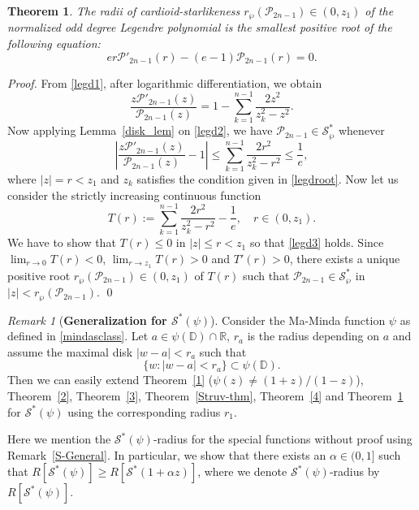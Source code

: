 \documentclass[12pt, reqno]{amsart}
\numberwithin{equation}{section}
\theoremstyle{plain}
\newtheorem{theorem}{Theorem}[section]
\theoremstyle{definition}
\theoremstyle{remark}
\newtheorem{remark}{Remark}[section]
\begin{document}
\begin{theorem}\label{5}
	The radii of cardioid-starlikeness $r_{\wp}(\mathcal{P}_{2n-1})\in (0,z_1)$ of the normalized odd degree Legendre polynomial is the smallest positive root of the following equation:
	\begin{equation*}
	er\mathcal{P}'_{2n-1}(r)-(e-1)\mathcal{P}_{2n-1}(r)=0.
	\end{equation*}	
\end{theorem}
\begin{proof}
	From \eqref{legd1}, after logarithmic differentiation, we obtain
	\begin{equation}\label{legd2}
	\frac{z\mathcal{P}'_{2n-1}(z)}{\mathcal{P}_{2n-1}(z)}=1-\sum_{k=1}^{n-1}\frac{2z^2}{z^2_k-z^2}.
	\end{equation}
	Now applying Lemma~\ref{disk_lem} on \eqref{legd2}, we have $\mathcal{P}_{2n-1}\in \mathcal{S}^{*}_{\wp}$ whenever
	\begin{equation}\label{legd3}
	\left|
	\frac{z\mathcal{P}'_{2n-1}(z)}{\mathcal{P}_{2n-1}(z)}-1\right|\leq \sum_{k=1}^{n-1}\frac{2r^2}{z^2_k-r^2}\leq\frac{1}{e},
	\end{equation}
	where $|z|=r<z_1$ and $z_k$ satisfies the condition given in \eqref{legdroot}. Now let us consider the strictly increasing continuous function
	$$T(r):=\sum_{k=1}^{n-1}\frac{2r^2}{z^2_k-r^2}-\frac{1}{e}, \quad r\in(0,z_1).$$
	We have to show that $T(r)\leq0$ in $|z|\leq r<z_1$ so that \eqref{legd3} holds. Since $\lim_{r\rightarrow0}T(r)<0$, $\lim_{r\rightarrow z_1}T(r)>0$ and $T'(r)>0$, there exists a unique positive root $r_{\wp}(\mathcal{P}_{2n-1})\in (0,z_1)$ of $T(r)$ such that $\mathcal{P}_{2n-1}\in \mathcal{S}^*_{\wp}$ in $|z|<r_{\wp}(\mathcal{P}_{2n-1})$. \qed
\end{proof}	
\begin{remark}[\bf{Generalization for $\mathcal{S}^*(\psi)$}]\label{S-General}
	Consider the Ma-Minda function $\psi$ as defined in \eqref{mindasclass}. Let $a \in \psi(\mathbb{D}) \cap \mathbb{R}$, $r_a$ is the radius depending on $a$ and assume the maximal disk $ |w-a|<r_a$ such that 
	$$\{w : |w-a|< r_a\} \subset \psi(\mathbb{D}).$$
	Then we can easily extend Theorem~\ref{1} ($\psi(z)\neq (1+z)/(1-z)$), Theorem~\ref{2}, Theorem~\ref{3}, Theorem~\ref{Struv-thm}, Theorem~\ref{4} and  Theorem~\ref{5} for $\mathcal{S}^{*}(\psi)$ using the corresponding radius $r_1$.
\end{remark}
Here we mention the $\mathcal{S}^*(\psi)$-radius for the special functions without proof using Remark~\eqref{S-General}. In particular, we show that there exists an $\alpha\in (0,1]$ such that
$R[\mathcal{S}^{*}(\psi)] \geq R[\mathcal{S}^{*}(1+\alpha z)]$, where we denote $\mathcal{S}^{*}(\psi)$-radius by $R[\mathcal{S}^{*}(\psi)]$.
\end{document}
